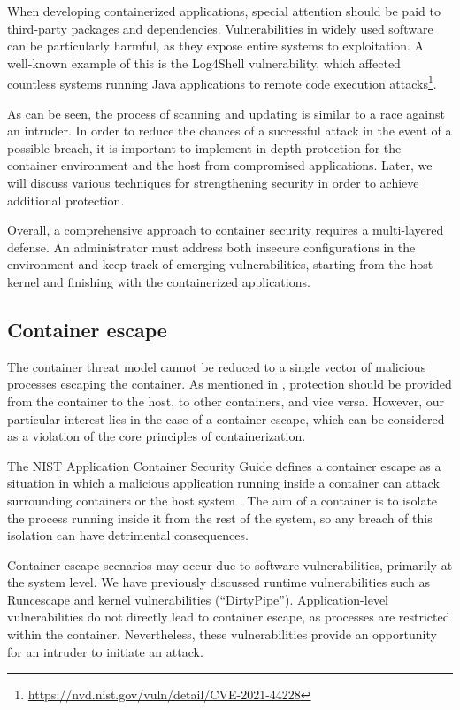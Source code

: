 When developing containerized applications, special attention should be paid to third-party packages and dependencies. Vulnerabilities in widely used software can be particularly harmful, as they expose entire systems to exploitation. A well-known example of this is the Log4Shell vulnerability, which affected countless systems running Java applications to remote code execution attacks\footnote{\url{https://nvd.nist.gov/vuln/detail/CVE-2021-44228}}.

As can be seen, the process of scanning and updating is similar to a race against an intruder. In order to reduce the chances of a successful attack in the event of a possible breach, it is important to implement in-depth protection for the container environment and the host from compromised applications. Later, we will discuss various techniques for strengthening security in order to achieve additional protection.

Overall, a comprehensive approach to container security requires a multi-layered defense. An administrator must address both insecure configurations in the environment and keep track of emerging vulnerabilities, starting from the host kernel and finishing with the containerized applications.


\clearpage
\subsection{Container escape}

The container threat model cannot be reduced to a single vector of malicious processes escaping the container. As mentioned in \cite{ieee:1}, protection should be provided from the container to the host, to other containers, and vice versa. However, our particular interest lies in the case of a container escape, which can be considered as a violation of the core principles of containerization.

The NIST Application Container Security Guide defines a container escape as a situation in which a malicious application running inside a container can attack surrounding containers or the host system \cite{nist:docker}. The aim of a container is to isolate the process running inside it from the rest of the system, so any breach of this isolation can have detrimental consequences.

Container escape scenarios may occur due to software vulnerabilities, primarily at the system level. We have previously discussed runtime vulnerabilities such as Runcescape and kernel vulnerabilities (``DirtyPipe''). Application-level vulnerabilities do not directly lead to container escape, as processes are restricted within the container. Nevertheless, these vulnerabilities provide an opportunity for an intruder to initiate an attack.

